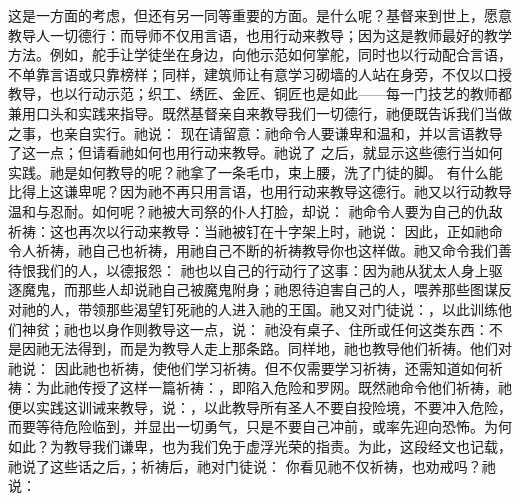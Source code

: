 这是一方面的考虑，但还有另一同等重要的方面。是什么呢？基督来到世上，愿意教导人一切德行：而导师不仅用言语，也用行动来教导；因为这是教师最好的教学方法。例如，舵手让学徒坐在身边，向他示范如何掌舵，同时也以行动配合言语，不单靠言语或只靠榜样；同样，建筑师让有意学习砌墙的人站在身旁，不仅以口授教导，也以行动示范；织工、绣匠、金匠、铜匠也是如此——每一门技艺的教师都兼用口头和实践来指导。既然基督亲自来教导我们一切德行，祂便既告诉我们当做之事，也亲自实行。祂说： 现在请留意：祂命令人要谦卑和温和，并以言语教导了这一点；但请看祂如何也用行动来教导。祂说了 之后，就显示这些德行当如何实践。祂是如何教导的呢？祂拿了一条毛巾，束上腰，洗了门徒的脚。 有什么能比得上这谦卑呢？因为祂不再只用言语，也用行动来教导这德行。祂又以行动教导温和与忍耐。如何呢？祂被大司祭的仆人打脸，却说： 祂命令人要为自己的仇敌祈祷：这也再次以行动来教导：当祂被钉在十字架上时，祂说： 因此，正如祂命令人祈祷，祂自己也祈祷，用祂自己不断的祈祷教导你也这样做。祂又命令我们善待恨我们的人，以德报怨： 祂也以自己的行动行了这事：因为祂从犹太人身上驱逐魔鬼，而那些人却说祂自己被魔鬼附身；祂恩待迫害自己的人，喂养那些图谋反对祂的人，带领那些渴望钉死祂的人进入祂的王国。祂又对门徒说：，以此训练他们神贫；祂也以身作则教导这一点，说： 祂没有桌子、住所或任何这类东西：不是因祂无法得到，而是为教导人走上那条路。同样地，祂也教导他们祈祷。他们对祂说： 因此祂也祈祷，使他们学习祈祷。但不仅需要学习祈祷，还需知道如何祈祷：为此祂传授了这样一篇祈祷：，即陷入危险和罗网。既然祂命令他们祈祷，祂便以实践这训诫来教导，说：，以此教导所有圣人不要自投险境，不要冲入危险，而要等待危险临到，并显出一切勇气，只是不要自己冲前，或率先迎向恐怖。为何如此？为教导我们谦卑，也为我们免于虚浮光荣的指责。为此，这段经文也记载，祂说了这些话之后，；祈祷后，祂对门徒说： 你看见祂不仅祈祷，也劝戒吗？祂说： 